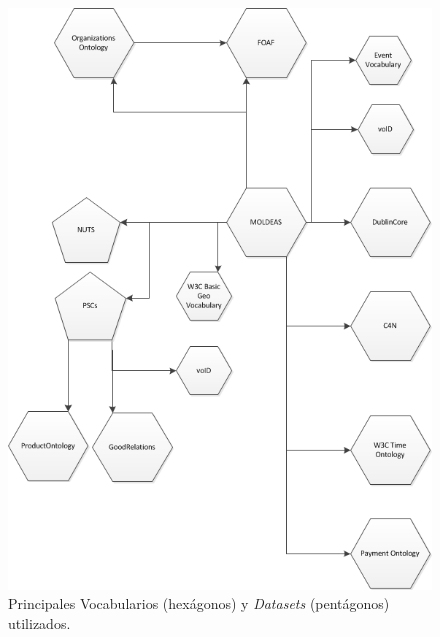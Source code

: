 \begin{figure}[!htp]
    \centering
	\includegraphics[width=16cm]{images/phd/modelo/contract-vocabs}
	\caption{Principales Vocabularios (hexágonos) y \textit{Datasets} (pentágonos) utilizados.}
	\label{fig:modelo-main-vocabs}
\end{figure}



